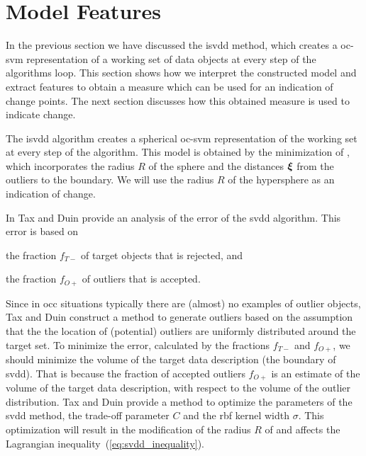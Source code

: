 \section{Model Features}\label{sec:method_model_features}
In the previous section we have discussed the \gls{isvdd} method, which creates a \gls{oc-svm} representation of a working set of data objects at every step of the algorithms loop.
This section shows how we interpret the constructed model and extract features to obtain a measure which can be used for an indication of change points.
The next section discusses how this obtained measure is used to indicate change.

The \gls{isvdd} algorithm creates a spherical \gls{oc-svm} representation of the working set at every step of the algorithm.
This model is obtained by the minimization of , which incorporates the radius $R$ of the sphere and the distances $\vectorsym{\xi}$ from the outliers to the boundary.
We will use the radius $R$ of the hypersphere as an indication of change.

In \cite{tax2002uniform} Tax and Duin provide an analysis of the error of the \gls{svdd} algorithm.
This error is based on
\begin{inparaenum}[\itshape 1\upshape)]
\item the fraction $f_{T-}$ of target objects that is rejected, and
\item the fraction $f_{O+}$ of outliers that is accepted.
\end{inparaenum}
Since in \gls{occ} situations typically there are (almost) no examples of outlier objects, Tax and Duin construct a method to generate outliers based on the assumption that the the location of (potential) outliers are uniformly distributed around the target set.
To minimize the error, calculated by the fractions $f_{T-}$ and $f_{O+}$, we should minimize the volume of the target data description (\ie the boundary of \gls{svdd}).
That is because the fraction of accepted outliers $f_{O+}$ is an estimate of the volume of the target data description, with respect to the volume of the outlier distribution.
Tax and Duin provide a method to optimize the parameters of the \gls{svdd} method, \ie the trade-off parameter $C$ and the \gls{rbf} kernel width $\sigma$.
This optimization will result in the modification of the radius $R$ of  and affects the Lagrangian inequality~(\ref{eq:svdd_inequality}).

